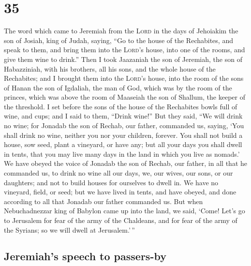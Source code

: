 \hypertarget{section-34}{%
\section{35}\label{section-34}}

 The word which came to Jeremiah from the \textsc{Lord} in
the days of Jehoiakim the son of Josiah, king of Judah, saying,
 ``Go to the house of the Rechabites, and speak to them,
and bring them into the \textsc{Lord}'s house, into one of the rooms,
and give them wine to drink.''  Then I took Jaazaniah the
son of Jeremiah, the son of Habazziniah, with his brothers, all his
sons, and the whole house of the Rechabites;  and I
brought them into the \textsc{Lord}'s house, into the room of the sons
of Hanan the son of Igdaliah, the man of God, which was by the room of
the princes, which was above the room of Maaseiah the son of Shallum,
the keeper of the threshold.  I set before the sons of the
house of the Rechabites bowls full of wine, and cups; and I said to
them, ``Drink wine!''  But they said, ``We will drink no
wine; for Jonadab the son of Rechab, our father, commanded us, saying,
`You shall drink no wine, neither you nor your children, forever.
 You shall not build a house, sow seed, plant a vineyard,
or have any; but all your days you shall dwell in tents, that you may
live many days in the land in which you live as nomads.' 
We have obeyed the voice of Jonadab the son of Rechab, our father, in
all that he commanded us, to drink no wine all our days, we, our wives,
our sons, or our daughters;  and not to build houses for
ourselves to dwell in. We have no vineyard, field, or seed;
 but we have lived in tents, and have obeyed, and done
according to all that Jonadab our father commanded us. 
But when Nebuchadnezzar king of Babylon came up into the land, we said,
`Come! Let's go to Jerusalem for fear of the army of the Chaldeans, and
for fear of the army of the Syrians; so we will dwell at Jerusalem.'\,''

\hypertarget{jeremiahs-speech-to-passers-by}{%
\subsection{Jeremiah's speech to
passers-by}\label{jeremiahs-speech-to-passers-by}}

